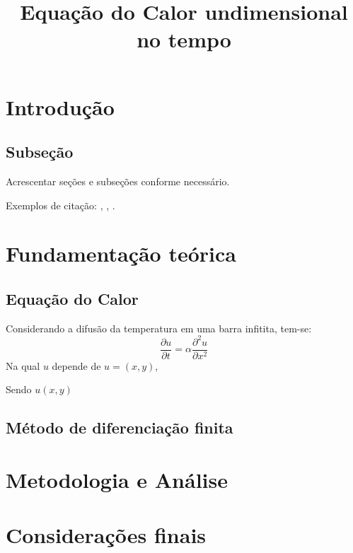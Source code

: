 \documentclass[a4paper,11pt]{article}
\title{Equação do Calor undimensional no tempo} %
\begin{document}
\maketitle

\author{ %
}

\vspace{8mm}





\section{Introdução}
 
\subsection{Subseção}

Acrescentar seções e subseções conforme necessário.

Exemplos de citação: \cite{web:16}, \citet{anna:06}, \citeauthor{pele:04}.

\section{Fundamentação teórica}
\subsection{Equaç\~ao do Calor}
Considerando a difusão da temperatura em uma barra infitita, tem-se: 
$$\dfrac{\partial u}{\partial t}= \alpha \dfrac{\partial^2 u}{\partial x^2}$$
Na qual $u$ depende de $u=(x,y)$,

Sendo $u(x,y)$

\subsection{M\'etodo de diferenciação finita}


\section{Metodologia e Análise}

\section{Considerações finais}


\end{document}
